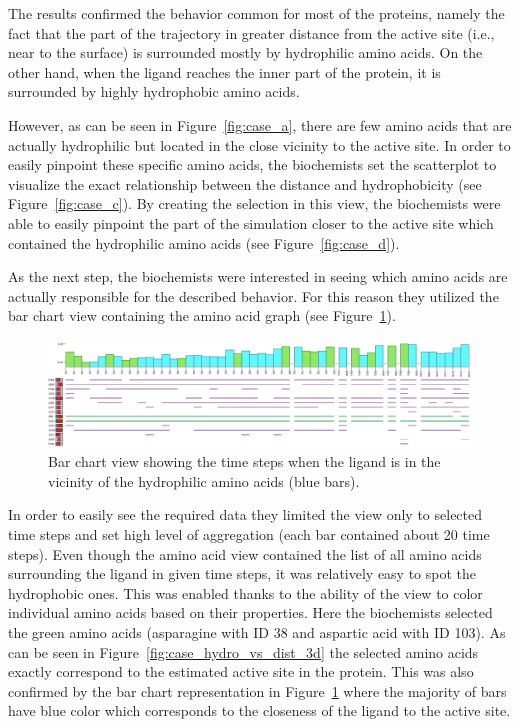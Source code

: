 \documentclass[twocolumn]{bmcart}%
\begin{document}
The results confirmed the behavior common for most of the proteins, namely the fact that the part of the trajectory in greater distance from the active site (i.e., near to the surface) is surrounded mostly by hydrophilic amino acids.
On the other hand, when the ligand reaches the inner part of the protein, it is surrounded by highly hydrophobic amino acids.

However, as can be seen in Figure~\ref{fig:case_a}, there are few amino acids that are actually hydrophilic but located in the close vicinity to the active site. 
In order to easily pinpoint these specific amino acids, the biochemists set the scatterplot to visualize the exact relationship between the distance and hydrophobicity (see Figure~\ref{fig:case_c}).
By creating the selection in this view, the biochemists were able to easily pinpoint the part of the simulation closer to the active site which contained the hydrophilic amino acids (see Figure~\ref{fig:case_d}).

As the next step, the biochemists were interested in seeing which amino acids are actually responsible for the described behavior.
For this reason they utilized the bar chart view containing the amino acid graph (see Figure~\ref{fig:case_hydro_vs_dist_bar}).

\begin{figure}[htb]
	\centering
  \includegraphics[width=0.95\linewidth]{img/case_hydro_vs_dist_bar.png}
  \caption{\label{fig:case_hydro_vs_dist_bar} Bar chart view showing the time steps when the ligand is in the vicinity of the hydrophilic amino acids (blue bars).}
\end{figure}


In order to easily see the required data they limited the view only to selected time steps and set high level of aggregation (each bar contained about 20 time steps).
Even though the amino acid view contained the list of all amino acids surrounding the ligand in given time steps, it was relatively easy to spot the hydrophobic ones.
This was enabled thanks to the ability of the view to color individual amino acids based on their properties. 
Here the biochemists selected the green amino acids (asparagine with ID 38 and aspartic acid with ID 103). 
As can be seen in Figure~\ref{fig:case_hydro_vs_dist_3d} the selected amino acids exactly correspond to the estimated active site in the protein.
This was also confirmed by the bar chart representation in Figure~\ref{fig:case_hydro_vs_dist_bar} where the majority of bars have blue color which corresponds to the closeness of the ligand to the active site.
\end{document}
